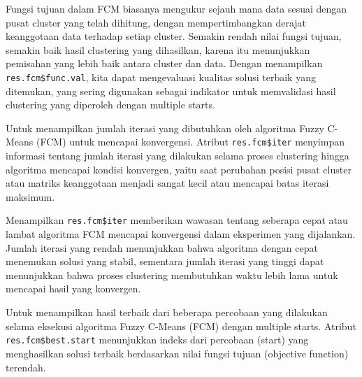 \documentclass[
  oneside]{book}
\newenvironment{Shaded}{\begin{snugshade}}{\end{snugshade}}
\newcommand{\CommentTok}[1]{\textcolor[rgb]{0.56,0.35,0.01}{\textit{#1}}}
\newcommand{\NormalTok}[1]{#1}
\newcommand{\SpecialCharTok}[1]{\textcolor[rgb]{0.81,0.36,0.00}{\textbf{#1}}}
\begin{document}
Fungsi tujuan dalam FCM biasanya mengukur sejauh mana data sesuai dengan pusat cluster yang telah dihitung, dengan mempertimbangkan derajat keanggotaan data terhadap setiap cluster. Semakin rendah nilai fungsi tujuan, semakin baik hasil clustering yang dihasilkan, karena itu menunjukkan pemisahan yang lebih baik antara cluster dan data. Dengan menampilkan \texttt{res.fcm\$func.val}, kita dapat mengevaluasi kualitas solusi terbaik yang ditemukan, yang sering digunakan sebagai indikator untuk memvalidasi hasil clustering yang diperoleh dengan multiple starts.

\begin{Shaded}
\end{Shaded}

Untuk menampilkan jumlah iterasi yang dibutuhkan oleh algoritma Fuzzy C-Means (FCM) untuk mencapai konvergensi. Atribut \texttt{res.fcm\$iter} menyimpan informasi tentang jumlah iterasi yang dilakukan selama proses clustering hingga algoritma mencapai kondisi konvergen, yaitu saat perubahan posisi pusat cluster atau matriks keanggotaan menjadi sangat kecil atau mencapai batas iterasi maksimum.

Menampilkan \texttt{res.fcm\$iter} memberikan wawasan tentang seberapa cepat atau lambat algoritma FCM mencapai konvergensi dalam eksperimen yang dijalankan. Jumlah iterasi yang rendah menunjukkan bahwa algoritma dengan cepat menemukan solusi yang stabil, sementara jumlah iterasi yang tinggi dapat menunjukkan bahwa proses clustering membutuhkan waktu lebih lama untuk mencapai hasil yang konvergen.

\begin{Shaded}
\end{Shaded}

Untuk menampilkan hasil terbaik dari beberapa percobaan yang dilakukan selama eksekusi algoritma Fuzzy C-Means (FCM) dengan multiple starts. Atribut \texttt{res.fcm\$best.start} menunjukkan indeks dari percobaan (start) yang menghasilkan solusi terbaik berdasarkan nilai fungsi tujuan (objective function) terendah.
\end{document}
